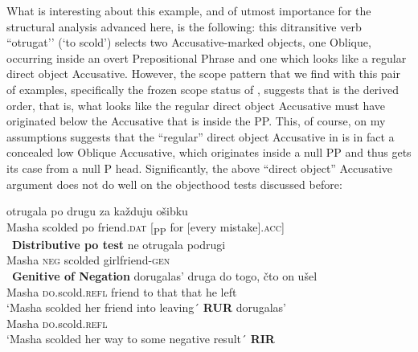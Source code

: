 \documentclass[output=paper,colorlinks,citecolor=brown]{./langscibook}
\begin{document}
What is interesting about this example, and of utmost importance for the structural analysis advanced here, is the following: this ditransitive verb “otrugat’’ (‘to scold’) selects two Accusative-marked objects, one Oblique, occurring inside an overt Prepositional Phrase and one which looks like a regular direct object Accusative. However, the scope pattern that we find with this pair of examples, specifically the frozen scope status of , suggests that  is the {derived} order, that is, what looks like the regular direct object Accusative must have originated below the Accusative that is inside the PP. This, of course, on my assumptions suggests that the “regular” direct object Accusative in  is in fact a concealed low Oblique Accusative, which originates inside a null PP and thus gets its case from a null P head. Significantly, the above “direct object” Accusative argument does not do well on the objecthood tests discussed before:


\ea%
    \label{ex:antonyuk:55}
    \ea \label{ex:antonyuk:55a}
      {otrugala} {po} {drugu} {} {za} {každuju}             {ošibku}\\
    Masha scolded  po friend.\textsc{dat} [\textsubscript{PP} for [every mistake].\textsc{acc}]\\
    \glt ~\hfill \textbf{Distributive po test}
    \ex \label{ex:antonyuk:55b}
        {ne}    {otrugala} {podrugi}\\
    Masha \textsc{neg} scolded   girlfriend-\textsc{gen}\\
    \glt ~\hfill \textbf{Genitive of Negation}
    \ex \label{ex:antonyuk:55c}
        {dorugalas’}         {druga} {do} {togo,} {čto}  {on} {ušel}\\
    Masha  \textsc{do}.scold.\textsc{refl} friend to  that  that  he left\\
    \glt `Masha scolded her friend into leaving´ \hfill \textbf{RUR}
    \ex \label{ex:antonyuk:55d}
        {dorugalas’}\\
    Masha  \textsc{do}.scold.\textsc{refl}\\
    \glt `Masha scolded her way to some negative result´ \hfill \textbf{RIR} \citep{Tatevosov2010}
    \z
\z
\end{document}
